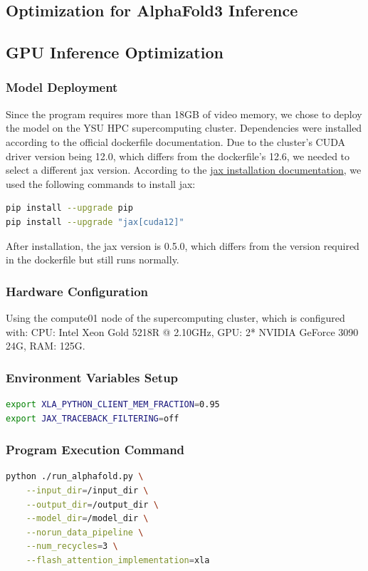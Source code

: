\documentclass[a4paper,12pt]{article}
\begin{document}
\subsection{Optimization for AlphaFold3 Inference}

\subsection{GPU Inference Optimization}

\subsubsection{Model Deployment}
Since the program requires more than 18GB of video memory, we chose to deploy the model on the YSU HPC supercomputing cluster. Dependencies were installed according to the official dockerfile documentation. Due to the cluster's CUDA driver version being 12.0, which differs from the dockerfile's 12.6, we needed to select a different jax version. According to the \href{https://docs.jax.dev/en/latest/installation.html#nvidia-gpu}{jax installation documentation}, we used the following commands to install jax:

\begin{lstlisting}[language=bash]
pip install --upgrade pip
pip install --upgrade "jax[cuda12]"
\end{lstlisting}

After installation, the jax version is 0.5.0, which differs from the version required in the dockerfile but still runs normally.

\subsubsection{Hardware Configuration}
Using the compute01 node of the supercomputing cluster, which is configured with: CPU: Intel Xeon Gold 5218R @ 2.10GHz, GPU: 2* NVIDIA GeForce 3090 24G, RAM: 125G.

\subsubsection{Environment Variables Setup}
\begin{lstlisting}[language=bash]
export XLA_PYTHON_CLIENT_MEM_FRACTION=0.95
export JAX_TRACEBACK_FILTERING=off
\end{lstlisting}

\subsubsection{Program Execution Command}
\begin{lstlisting}[language=bash]
python ./run_alphafold.py \
    --input_dir=/input_dir \
    --output_dir=/output_dir \
    --model_dir=/model_dir \
    --norun_data_pipeline \
    --num_recycles=3 \
    --flash_attention_implementation=xla
\end{lstlisting}
\end{document}
